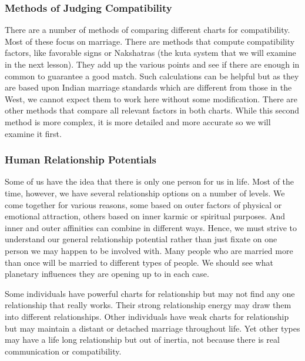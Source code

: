  

\subsubsection{Methods of Judging Compatibility}

 

There are a number of methods of comparing different charts for compatibility. Most of these focus on marriage. There are methods that compute compatibility factors, like favorable signs or Nakshatras (the kuta system that we will examine in the next lesson). They add up the various points and see if there are enough in common to guarantee a good match. Such calculations can be helpful but as they are based upon Indian marriage standards which are different from those in the West, we cannot expect them to work here without some modification. There are other methods that compare all relevant factors in both charts. While this second method is more complex, it is more detailed and more accurate so we will examine it first.

 

\subsubsection{Human Relationship Potentials}

 

Some of us have the idea that there is only one person for us in life. Most of the time, however, we have several relationship options on a number of levels. We come together for various reasons, some based on outer factors of physical or emotional attraction, others based on inner karmic or spiritual purposes. And inner and outer affinities can combine in different ways. Hence, we must strive to understand our general relationship potential rather than just fixate on one person we may happen to be involved with. Many people who are married more than once will be married to different types of people. We should see what planetary influences they are opening up to in each case.

 

Some individuals have powerful charts for relationship but may not find any one relationship that really works. Their strong relationship energy may draw them into different relationships. Other individuals have weak charts for relationship but may maintain a distant or detached marriage throughout life. Yet other types may have a life long relationship but out of inertia, not because there is real communication or compatibility.

